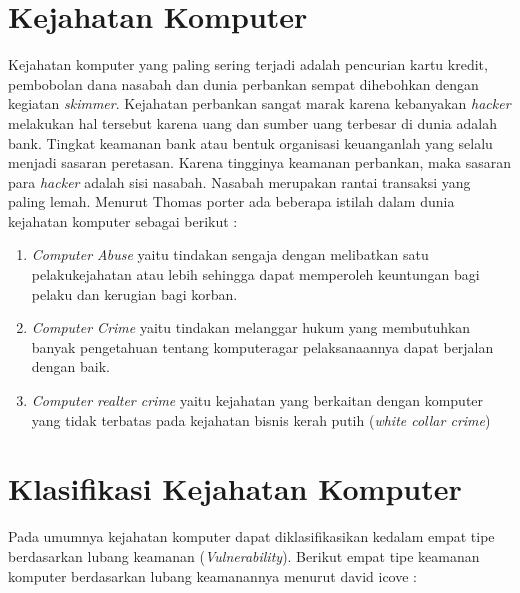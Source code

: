 \section{Kejahatan Komputer}
Kejahatan komputer yang paling sering terjadi adalah pencurian kartu kredit, pembobolan dana nasabah dan dunia perbankan sempat dihebohkan dengan kegiatan \textit {skimmer}. Kejahatan perbankan sangat marak karena kebanyakan \textit{hacker} melakukan hal tersebut karena uang dan sumber uang terbesar di dunia adalah bank. Tingkat keamanan bank atau bentuk organisasi keuanganlah  yang selalu menjadi sasaran peretasan. Karena tingginya keamanan perbankan, maka sasaran para \textit{hacker} adalah sisi nasabah. Nasabah merupakan rantai transaksi yang paling lemah. Menurut Thomas porter ada beberapa istilah dalam dunia kejahatan komputer sebagai berikut :
\begin{enumerate}
\item
\textit{Computer Abuse} yaitu tindakan sengaja dengan melibatkan satu pelakukejahatan atau lebih sehingga dapat memperoleh keuntungan bagi pelaku dan kerugian bagi korban.
\item
\textit{Computer Crime} yaitu tindakan melanggar hukum yang membutuhkan banyak pengetahuan tentang komputeragar pelaksanaannya dapat berjalan dengan baik.
\item
\textit{Computer realter crime} yaitu kejahatan yang berkaitan dengan komputer yang tidak terbatas pada kejahatan bisnis kerah putih (\textit{white collar crime})

\end{enumerate}

\section{Klasifikasi Kejahatan Komputer}
Pada umumnya kejahatan komputer dapat diklasifikasikan kedalam empat tipe berdasarkan lubang keamanan (\textit{Vulnerability}). Berikut empat tipe keamanan komputer berdasarkan lubang keamanannya menurut david icove \cite{Icove} :  

